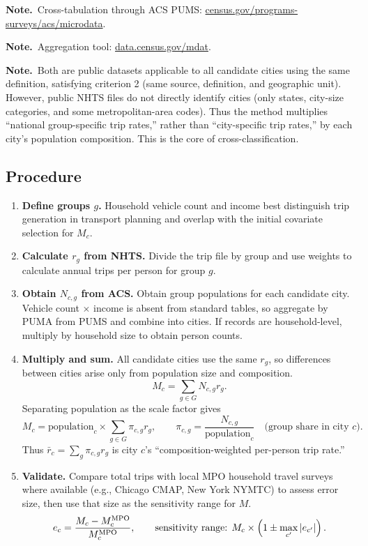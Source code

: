 \documentclass[10pt,a4paper]{article}
\newcommand{\note}{\textbf{Note.}\ }
\begin{document}
\note Cross-tabulation through ACS PUMS: \href{https://www.census.gov/programs-surveys/acs/microdata.html}{census.gov/programs-surveys/acs/microdata}.

\note Aggregation tool: \href{https://data.census.gov/mdat/}{data.census.gov/mdat}.

\note Both are public datasets applicable to all candidate cities using the same definition, satisfying criterion 2 (same source, definition, and geographic unit). However, public NHTS files do not directly identify cities (only states, city-size categories, and some metropolitan-area codes). Thus the method multiplies ``national group-specific trip rates,'' rather than ``city-specific trip rates,'' by each city's population composition. This is the core of cross-classification.

\subsection{Procedure}
\begin{enumerate}
\item \textbf{Define groups $g$.} Household vehicle count and income best distinguish trip generation in transport planning and overlap with the initial covariate selection for $M_c$.
\item \textbf{Calculate $r_g$ from NHTS.} Divide the trip file by group and use weights to calculate annual trips per person for group $g$.
\item \textbf{Obtain $N_{c,g}$ from ACS.} Obtain group populations for each candidate city. Vehicle count $\times$ income is absent from standard tables, so aggregate by PUMA from PUMS and combine into cities. If records are household-level, multiply by household size to obtain person counts.
\item \textbf{Multiply and sum.} All candidate cities use the same $r_g$, so differences between cities arise only from population size and composition.
\[
M_c=\sum_{g\in G}N_{c,g}r_g.
\]
Separating population as the scale factor gives
\[
M_c=\text{population}_c\times\sum_{g\in G}\pi_{c,g}r_g,
\qquad \pi_{c,g}=\frac{N_{c,g}}{\text{population}_c}
\quad\text{(group share in city }c\text{)}.
\]
Thus $\bar r_c=\sum_g\pi_{c,g}r_g$ is city $c$'s ``composition-weighted per-person trip rate.''
\item \textbf{Validate.} Compare total trips with local MPO household travel surveys where available (e.g., Chicago CMAP, New York NYMTC) to assess error size, then use that size as the sensitivity range for $M$.
\[
e_c=\frac{M_c-M_c^{\rm MPO}}{M_c^{\rm MPO}},
\qquad \text{sensitivity range: }M_c\times\left(1\pm\max_{c'}|e_{c'}|\right).
\]
\end{enumerate}
\end{document}

